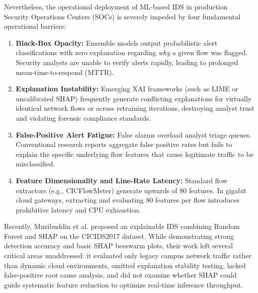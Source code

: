 \documentclass[conference]{IEEEtran}
\begin{document}
Nevertheless, the operational deployment of ML-based IDS in production Security Operations Centers (SOCs) is severely impeded by four fundamental operational barriers:
\begin{enumerate}
    \item \textbf{Black-Box Opacity:} Ensemble models output probabilistic alert classifications with zero explanation regarding \textit{why} a given flow was flagged. Security analysts are unable to verify alerts rapidly, leading to prolonged mean-time-to-respond (MTTR)\cite{lundberg2017unified}.
    \item \textbf{Explanation Instability:} Emerging XAI frameworks (such as LIME or uncalibrated SHAP) frequently generate conflicting explanations for virtually identical network flows or across retraining iterations, destroying analyst trust and violating forensic compliance standards.
    \item \textbf{False-Positive Alert Fatigue:} False alarms overload analyst triage queues. Conventional research reports aggregate false positive rates but fails to explain the specific underlying flow features that cause legitimate traffic to be misclassified.
    \item \textbf{Feature Dimensionality and Line-Rate Latency:} Standard flow extractors (e.g., CICFlowMeter) generate upwards of 80 features. In gigabit cloud gateways, extracting and evaluating 80 features per flow introduces prohibitive latency and CPU exhaustion.
\end{enumerate}

Recently, Muzibuddin et al.\cite{muzibuddin2026explainable} proposed an explainable IDS combining Random Forest and SHAP on the CICIDS2017 dataset. While demonstrating strong detection accuracy and basic SHAP beeswarm plots, their work left several critical areas unaddressed: it evaluated only legacy campus network traffic rather than dynamic cloud environments, omitted explanation stability testing, lacked false-positive root cause analysis, and did not examine whether SHAP could guide systematic feature reduction to optimize real-time inference throughput.
\end{document}
